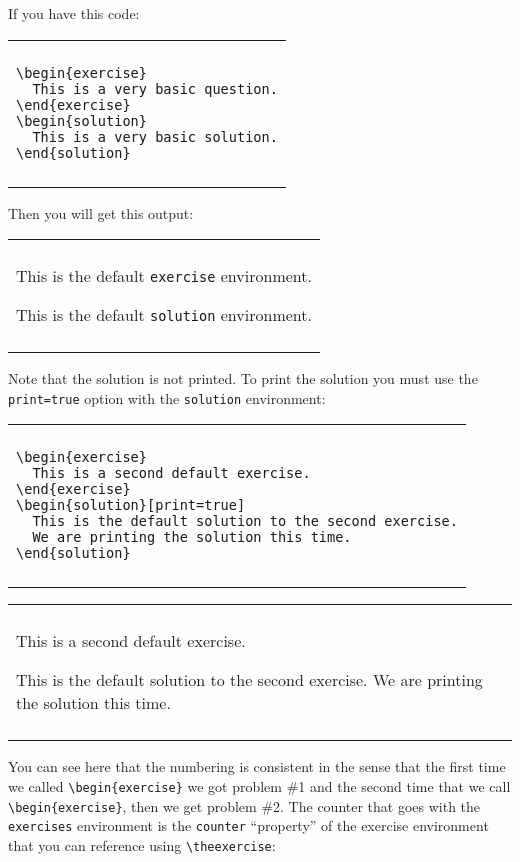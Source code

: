 \documentclass{article}
\newenvironment{myBlock}
    {\begin{center}
    \begin{tabular}{|p{0.9\textwidth}|}
    \hline\\
    }
    {
    \\\\\hline
    \end{tabular}
    \end{center}
    }
\begin{document}
If you have this code:

\begin{myBlock}
\begin{verbatim}
\begin{exercise}
  This is a very basic question.
\end{exercise}
\begin{solution}
  This is a very basic solution.
\end{solution}
\end{verbatim}
\end{myBlock}


Then you will get this output:

\begin{myBlock}
\begin{exercise}
  This is the default \texttt{exercise} environment.
\end{exercise}
\begin{solution}
  This is the default \texttt{solution} environment.
\end{solution}
\end{myBlock}


Note that the solution is not printed.
To print the solution you must use the \verb'print=true' option with the \verb'solution' environment:

\begin{myBlock}
\begin{verbatim}
\begin{exercise}
  This is a second default exercise.
\end{exercise}
\begin{solution}[print=true]
  This is the default solution to the second exercise.
  We are printing the solution this time.
\end{solution}
\end{verbatim}
\end{myBlock}


\begin{myBlock}
\begin{exercise}
  This is a second default exercise.
\end{exercise}
\begin{solution}[print=true]
  This is the default solution to the second exercise.
  We are printing the solution this time.
\end{solution}
\end{myBlock}


You can see here that the numbering is consistent in the sense that the first time we called \verb'\begin{exercise}' we got problem \#1 and the second time that we call \verb'\begin{exercise}', then we get problem \#2.
The counter that goes with the \texttt{exercises} environment is the \texttt{counter} ``property'' of the exercise environment that you can reference using \verb'\theexercise':
\end{document}

